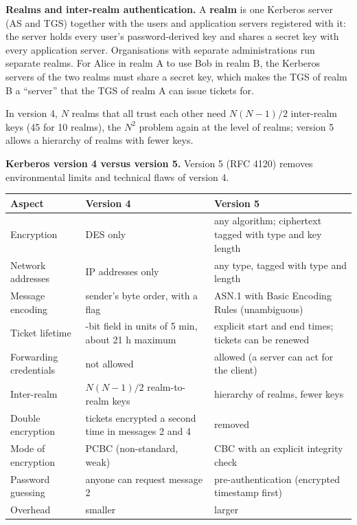 \textbf{Realms and inter-realm authentication.} A \textbf{realm} is one Kerberos server (AS and TGS) together with the users and application servers registered with it: the server holds every user's password-derived key and shares a secret key with every application server. Organisations with separate administrations run separate realms. For Alice in realm A to use Bob in realm B, the Kerberos servers of the two realms must share a secret key, which makes the TGS of realm B a ``server'' that the TGS of realm A can issue tickets for.
\begin{center}
\end{center}
In version 4, $N$ realms that all trust each other need $N(N-1)/2$ inter-realm keys (45 for 10 realms), the $N^2$ problem again at the level of realms; version 5 allows a hierarchy of realms with fewer keys.

\textbf{Kerberos version 4 versus version 5.} Version 5 (RFC 4120) removes environmental limits and technical flaws of version 4.
\begin{center}\small
\begin{tabularx}{\textwidth}{@{}l>{\raggedright\arraybackslash}X>{\raggedright\arraybackslash}X@{}}
\toprule
Aspect & Version 4 & Version 5\\
\midrule
Encryption & DES only & any algorithm; ciphertext tagged with type and key length\\
Network addresses & IP addresses only & any type, tagged with type and length\\
Message encoding & sender's byte order, with a flag & ASN.1 with Basic Encoding Rules (unambiguous)\\
Ticket lifetime & 8-bit field in units of 5 min, about 21 h maximum & explicit start and end times; tickets can be renewed\\
Forwarding credentials & not allowed & allowed (a server can act for the client)\\
Inter-realm & $N(N-1)/2$ realm-to-realm keys & hierarchy of realms, fewer keys\\
Double encryption & tickets encrypted a second time in messages 2 and 4 & removed\\
Mode of encryption & PCBC (non-standard, weak) & CBC with an explicit integrity check\\
Password guessing & anyone can request message 2 & pre-authentication (encrypted timestamp first)\\
Overhead & smaller & larger\\
\bottomrule
\end{tabularx}
\end{center}

